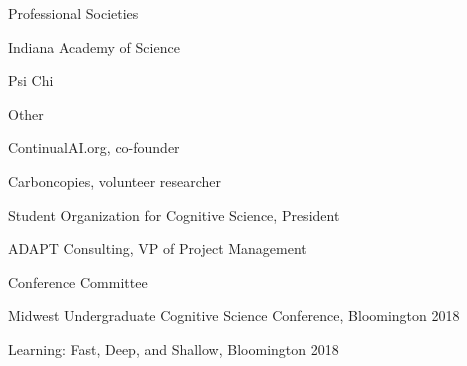 \newpage
{}
\begin{cventries}

  \cventry
    {Professional Societies} %
    {} %
    {} %
    {} %
    {
      \begin{cvitems} %
        \item {Indiana Academy of Science}
	\item{Psi Chi}
      \end{cvitems}
    }

  \cventry
    {Other} %
    {} %
    {} %
    {} %
    {
      \begin{cvitems} %
        \item {ContinualAI.org, co-founder}
	\item {Carboncopies, volunteer researcher}
	\item {Student Organization for Cognitive Science, President}
	\item {ADAPT Consulting, VP of Project Management}
      \end{cvitems}
    }

 \cventry
    {Conference Committee} %
    {} %
    {} %
    {} %
    {
      \begin{cvitems} %
        \item {Midwest Undergraduate Cognitive Science Conference, Bloomington 2018}
	\item{Learning: Fast, Deep, and Shallow, Bloomington 2018}
      \end{cvitems}
    }
\end{cventries}
